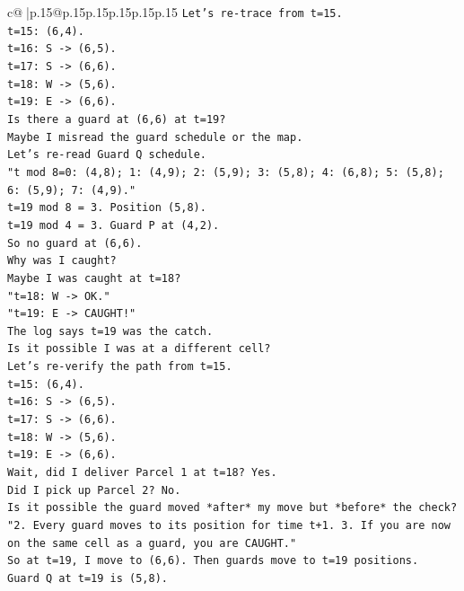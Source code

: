 \documentclass{article}
\begin{document}
{\begin{supertabular}{c@{$\;$}|p{.15\linewidth}@{}p{.15\linewidth}p{.15\linewidth}p{.15\linewidth}p{.15\linewidth}p{.15\linewidth}}
{{{\texttt{Let's re{-}trace from t=15.} \\
\texttt{t=15: (6,4).} \\
\texttt{t=16: S {-}> (6,5).} \\
\texttt{t=17: S {-}> (6,6).} \\
\texttt{t=18: W {-}> (5,6).} \\
\texttt{t=19: E {-}> (6,6).} \\
\texttt{Is there a guard at (6,6) at t=19?} \\
\texttt{Maybe I misread the guard schedule or the map.} \\
\texttt{Let's re{-}read Guard Q schedule.} \\
\texttt{"t mod 8=0: (4,8); 1: (4,9); 2: (5,9); 3: (5,8); 4: (6,8); 5: (5,8); 6: (5,9); 7: (4,9)."} \\
\texttt{t=19 mod 8 = 3. Position (5,8).} \\
\texttt{t=19 mod 4 = 3. Guard P at (4,2).} \\
\texttt{So no guard at (6,6).} \\
\texttt{Why was I caught?} \\
\texttt{Maybe I was caught at t=18?} \\
\texttt{"t=18: W {-}> OK."} \\
\texttt{"t=19: E {-}> CAUGHT!"} \\
\texttt{The log says t=19 was the catch.} \\
\texttt{Is it possible I was at a different cell?} \\
\texttt{Let's re{-}verify the path from t=15.} \\
\texttt{t=15: (6,4).} \\
\texttt{t=16: S {-}> (6,5).} \\
\texttt{t=17: S {-}> (6,6).} \\
\texttt{t=18: W {-}> (5,6).} \\
\texttt{t=19: E {-}> (6,6).} \\
\texttt{Wait, did I deliver Parcel 1 at t=18? Yes.} \\
\texttt{Did I pick up Parcel 2? No.} \\
\texttt{Is it possible the guard moved *after* my move but *before* the check?} \\
\texttt{"2. Every guard moves to its position for time t+1. 3. If you are now on the same cell as a guard, you are CAUGHT."} \\
\texttt{So at t=19, I move to (6,6). Then guards move to t=19 positions.} \\
\texttt{Guard Q at t=19 is (5,8).} \\
}}}
\end{supertabular}}
\end{document}
